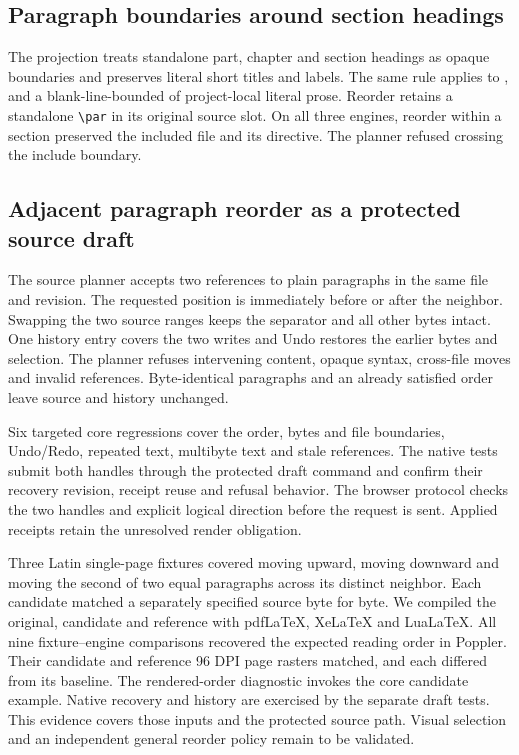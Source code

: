 \subsection{Paragraph boundaries around section headings}
The projection treats standalone part, chapter and section headings as
opaque boundaries and preserves literal short titles and labels. The same
rule applies to \texttt{\string\newpage}, \texttt{\string\clearpage} and a
blank-line-bounded \texttt{\string} of project-local literal prose.
Reorder retains a standalone \texttt{\textbackslash{}par} in its original source
slot. On all three engines, reorder within a section preserved the included
file and its directive. The planner refused crossing the include boundary.

\subsection{Adjacent paragraph reorder as a protected source draft}
\label{sec:adjacent-paragraph-draft}
The source planner accepts two references to plain paragraphs in the same
file and revision. The requested position is immediately before or after the
neighbor. Swapping the two source ranges keeps the separator and all other
bytes intact. One history entry covers the two writes and Undo restores the
earlier bytes and selection. The planner refuses intervening content,
opaque syntax, cross-file moves and invalid references. Byte-identical
paragraphs and an already satisfied order leave source and history unchanged.

Six targeted core regressions cover the order, bytes and file boundaries,
Undo/Redo, repeated text, multibyte text and stale references. The native
tests submit both handles through the protected draft command and confirm
their recovery revision, receipt reuse and refusal behavior. The browser
protocol checks the two handles and explicit logical direction before the
request is sent. Applied receipts retain the unresolved render obligation.

Three Latin single-page fixtures covered moving upward, moving downward and
moving the second of two equal paragraphs across its distinct neighbor. Each
candidate matched a separately specified source byte for byte. We compiled the
original, candidate and reference with pdf\LaTeX{}, Xe\LaTeX{} and Lua\LaTeX{}.
All nine fixture--engine comparisons recovered the expected reading order
in Poppler. Their candidate and reference 96 DPI page rasters matched, and
each differed from its baseline. The rendered-order diagnostic invokes the
core candidate example. Native recovery and history are exercised by the
separate draft tests. This evidence covers those inputs and the protected
source path. Visual selection and an independent general reorder policy
remain to be validated.

